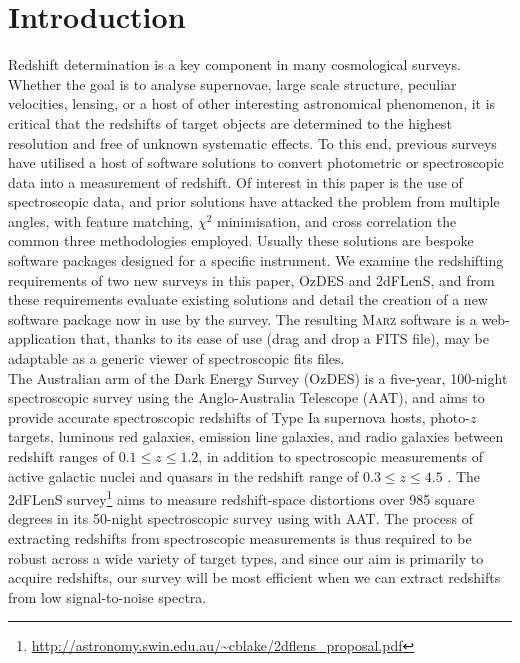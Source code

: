 \documentclass[5p]{elsarticle}
\newcommand{\red}{\color{red}}
\newcommand{\marz}{\textsc{Marz}}
\begin{document}
\linenumbers


\section{Introduction}


Redshift determination is a key component in many cosmological surveys. Whether the goal is to analyse supernovae, large scale structure, peculiar velocities, lensing, or a host of other interesting astronomical phenomenon, it is critical that the redshifts of target objects are determined to the highest resolution and free of unknown systematic effects. To this end, previous surveys have utilised a host of software solutions to convert photometric or spectroscopic data into a measurement of redshift. Of interest in this paper is the use of spectroscopic data, and prior solutions have attacked the problem from multiple angles, with feature matching, $\chi^2$ minimisation, and cross correlation the common three methodologies employed.  Usually these solutions are bespoke software packages designed for a specific instrument.  We examine the redshifting requirements of two new surveys in this paper, OzDES and 2dFLenS, and from these requirements evaluate existing solutions and detail the creation of a new software package now in use by the survey. The resulting \marz{} software is a web-application that, thanks to its ease of use (drag and drop a FITS file), may be adaptable as a generic viewer of spectroscopic fits files.\\ %


The Australian arm of the Dark Energy Survey (OzDES) is a five-year, 100-night spectroscopic survey using the Anglo-Australia Telescope (AAT), and aims to provide accurate spectroscopic redshifts of Type Ia supernova hosts, photo-$z$ targets, luminous red galaxies, emission line galaxies, and radio galaxies between redshift ranges of $0.1 \leq  z \leq 1.2$, in addition to spectroscopic measurements of active galactic nuclei and quasars in the redshift range of $0.3 \leq z \leq 4.5$ \citep{fang2015}. The 2dFLenS survey\footnote{\url{http://astronomy.swin.edu.au/~cblake/2dflens_proposal.pdf}} aims to measure redshift-space distortions over 985 square degrees in its 50-night spectroscopic survey using with AAT.  The process of extracting redshifts from spectroscopic measurements is thus required to be robust across a wide variety of target types, and since our aim is primarily to acquire redshifts, our survey will be most efficient when we can extract redshifts from low signal-to-noise spectra.
\end{document}
